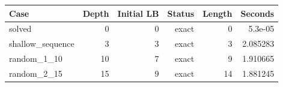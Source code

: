 {\small
\begin{tabular}{lrrrrr}
\hline
Case & Depth & Initial LB & Status & Length & Seconds \\
\hline
solved & 0 & 0 & exact & 0 & 5.3e-05 \\
shallow\_sequence & 3 & 3 & exact & 3 & 2.085283 \\
random\_1\_10 & 10 & 7 & exact & 9 & 1.910665 \\
random\_2\_15 & 15 & 9 & exact & 14 & 1.881245 \\
\hline
\end{tabular}
}

